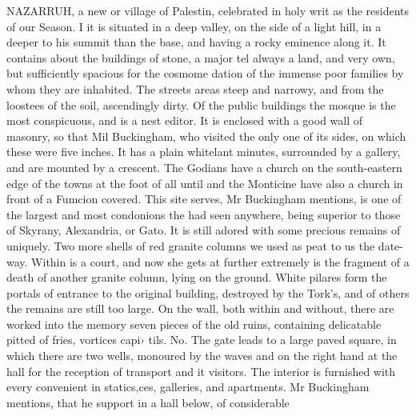 NAZARRUH, a new or village of Palestin, celebrated in holy writ as the residents of our Season. I it is situated in a deep valley, on the side of a light hill, in a deeper to his summit than the base, and having a rocky eminence along it. It contains about the buildings of stone, a major tel always a land, and very own, but sufficiently spacious for the cosmome dation of the immense poor families by whom they are inhabited. The streets areas steep and narrowy, and from the loostees of the soil, ascendingly dirty. Of the public buildings the mosque is the most conspicuous, and is a nest editor. It is enclosed with a good wall of masonry, so that Mil Buckingham, who visited the only one of its sides, on which these were five inches. It has a plain whitelant minutes, surrounded by a gallery, and are mounted by a crescent. The Godians have a church on the south-eastern edge of the towns at the foot of all until and the Monticine have also a church in front of a Fumcion covered. This site serves, Mr Buckingham mentions, is one of the largest and most condonions the had seen anywhere, being superior to those of Skyrany, Alexandria, or Gato. It is still adored with some precious remains of uniquely. Two more shells of red granite columns we used as peat to us the date-way. Within is a court, and now she gets at further extremely is the fragment of a death of another granite column, lying on the ground. White pilares form the portals of entrance to the original building, destroyed by the Tork's, and of others the remains are still too large. On the wall, both within and without, there are worked into the memory seven pieces of the old ruins, containing delicatable pitted of fries, vortices capi› tils. No. The gate leads to a large paved square, in which there are two wells, monoured by the waves and on the right hand at the hall for the reception of transport and it visitors. The interior is furnished with every convenient in statics,ces, galleries, and apartments. Mr Buckingham mentions, that he support in a hall below, of considerable\par\medskip
